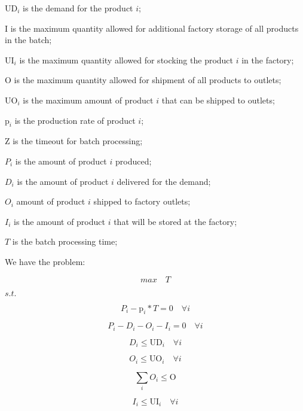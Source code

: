 \documentclass[authoryear,manuscript,12pt]{elsarticle}
\begin{document}
$\textrm{UD}_i$ is the demand for the product $i$;

$\textrm{I}$ is the maximum quantity allowed for additional factory storage of all products in the batch;

$\textrm{UI}_i$ is the maximum quantity allowed for stocking the product $i$ in the factory;

$\textrm{O}$ is the maximum quantity allowed for shipment of all products to outlets;

$\textrm{UO}_i$ is the maximum amount of product $i$ that can be shipped to outlets;

$\textrm{p}_i$ is the production rate of product $i$;

$\textrm{Z}$ is the timeout for batch processing;

$P_i$ is the amount of product $i$ produced;

$D_i$ is the amount of product $i$ delivered for the demand;

$O_i$ amount of product $i$ shipped to factory outlets;

$I_i$ is the amount of product $i$ that will be stored at the factory;

$T$ is the batch processing time;

We have the problem:

\begin{equation}
\label{MBPTMP01}
max \quad T
\end{equation}

$s.t.$

\begin{equation}
P_i - \textrm{p}_i * T  = 0 \quad \forall i
\end{equation}

\begin{equation}
P_i - D_i - O_i - I_i = 0 \quad \forall i
\end{equation}

\begin{equation}
\label{MBPTMP04}
D_i \leq \textrm{UD}_i \quad \forall i
\end{equation}

\begin{equation}
O_i \leq \textrm{UO}_i \quad \forall i
\end{equation}

\begin{equation}
\sum_i{O_i} \leq \textrm{O}
\end{equation}

\begin{equation}
I_i \leq \textrm{UI}_i \quad \forall i
\end{equation}
\end{document}
